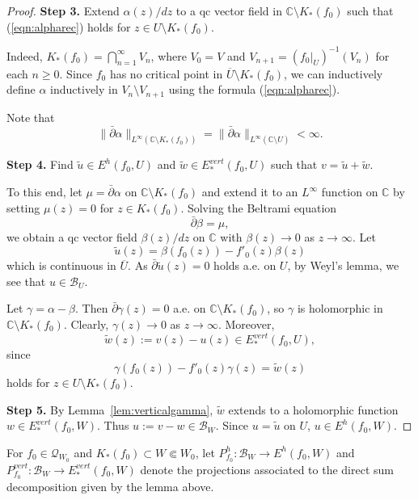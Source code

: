 \documentclass{amsart}
\numberwithin{equation}{section}
\newcommand{\C}{\mathbb C}
\theoremstyle{definition}
\theoremstyle{remark}
\begin{document}
\begin{proof}
{\bf Step 3.} Extend $\alpha(z)/dz$ to a qc vector field in $\C\setminus K_*(f_0)$ such that 
(\ref{eqn:alpharec}) holds for $z\in U\setminus K_*(f_0)$.

Indeed, $K_*(f_0)=\bigcap_{n=1}^\infty V_n$, where $V_0=V$ and $V_{n+1}=(f_0|_U)^{-1}(V_n)$ for each $n\ge 0$. Since $f_0$ has no critical point in $\overline{U}\setminus K_*(f_0)$, we can inductively define $\alpha$ inductively in $V_n\setminus V_{n+1}$ using the formula (\ref{eqn:alpharec}). 

Note that 
$$\|\bar{\partial }\alpha\|_{L^\infty (\C\setminus K_*(f_0))}=\|\bar{\partial}\alpha\|_{L^\infty(\C\setminus U)}<\infty.$$

{\bf Step 4.} Find $\widetilde{u}\in E^h(f_0,U)$ and $\widetilde{w}\in E^{vert}_*(f_0,U)$ such that $v=\widetilde{u}+\widetilde{w}$.

To this end, let $\mu=\bar{\partial} \alpha$ on $\C\setminus K_*(f_0)$ and extend it to an $L^\infty$ function on $\mathbb{C}$ by setting $\mu(z)=0$ for $z\in K_*(f_0)$. Solving the Beltrami equation 
$$\bar{\partial} \beta=\mu,$$
we obtain a qc vector field $\beta(z)/dz$ on $\mathbb{C}$ with $\beta(z)\to 0$ as $z\to\infty$. 
Let $$\widetilde{u}(z)=\beta(f_0(z))-f'_0(z) \beta(z)$$ which is continuous in $\overline{U}$. As 
$\bar{\partial} \widetilde{u}(z)=0$ holds a.e. on $U$, by Weyl's lemma, we see that $u\in \mathcal{B}_{U}$.

Let $\gamma=\alpha-\beta$. Then $\bar{\partial}\gamma(z)=0$ a.e. on $\mathbb{C}\setminus K_*(f_0)$, so $\gamma$ is holomorphic in $\mathbb{C}\setminus K_*(f_0)$. Clearly, $\gamma(z)\to 0$ as $z\to \infty$.  Moreover, 
$$\widetilde{w}(z):=v(z)-u(z)\in E^{vert}_*(f_0, U),$$ since  
$$\gamma(f_0(z))-f'_0(z)\gamma(z)=\widetilde{w}(z)$$
holds for $z\in U\setminus K_*(f_0)$. 

{\bf Step 5.} By Lemma~\ref{lem:verticalgamma}, $\widetilde{w}$ extends to a holomorphic function $w\in E^{vert}_*(f_0, W)$. Thus $u:=v-w\in \mathcal{B}_{W}$. Since $u=\widetilde{u}$ on $U$,  $u\in E^h(f_0,W)$. 
\end{proof}
For $f_0\in \mathcal{Q}_{W_0}$ and $K_*(f_0)\subset W\Subset W_0$, let $P_{f_0}^h:\mathcal{B}_{W}\to E^h(f_0,W)$ and $P_{f_0}^{vert}:\mathcal{B}_{W}\to E^{vert}_*(f_0,W)$ denote the projections associated to the direct sum decomposition given by the lemma above.  

\end{document}

